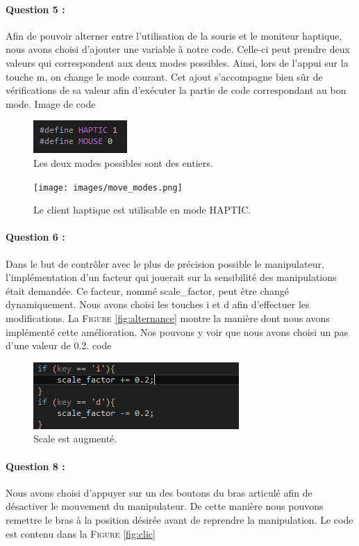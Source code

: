 \documentclass[a4paper,12pt]{article}
\begin{document}
\paragraph{Question 5 :} Afin de pouvoir alterner entre l'utilisation de la souris et le moniteur haptique, nous avons choisi d'ajouter une variable à notre code. Celle-ci peut prendre deux valeurs qui correspondent aux deux modes possibles. Ainsi, lors de l'appui sur la touche \og{}m\fg{}, on change le mode courant. Cet ajout s'accompagne bien sûr de vérifications de sa valeur afin d'exécuter la partie de code correspondant au bon mode.
 Image de code
\begin{figure}
  \centering
  \includegraphics{images/modes.png}
  \caption{Les deux modes possibles sont des entiers.}
  \label{fig:}
\end{figure}
\begin{figure}
  \centering
  \texttt{[image: images/move\_modes.png]}
  \caption{Le client haptique est utilisable en mode HAPTIC.}
  \label{fig:}
\end{figure}

\paragraph{Question 6 :} Dans le but de contrôler avec le plus de précision possible le manipulateur, l'implémentation d'un facteur qui jouerait sur la sensibilité des manipulations était demandée. Ce facteur, nommé \og{}scale_factor\fg{}, peut être changé dynamiquement. Nous avons choisi les touches \og{}i\fg{} et \og{}d\fg{} afin d'effectuer les modifications. La \textsc{Figure} \ref{fig:alternance} montre la manière dont nous avons implémenté cette amélioration. Nos pouvons y voir que nous avons choisi un pas d'une valeur de 0.2.
code
\begin{figure}
  \centering
  \includegraphics{images/scale.png}
  \caption{Scale est augmenté.}
  \label{fig:}
\end{figure}

\paragraph{Question 8 :} Nous avons choisi d'appuyer sur un des boutons du bras articulé afin de désactiver le mouvement du manipulateur. De cette manière nous pouvons remettre le bras à la position désirée avant de reprendre la manipulation. Le code est contenu dans la \textsc{Figure} \ref{fig:clic}
\end{document}
